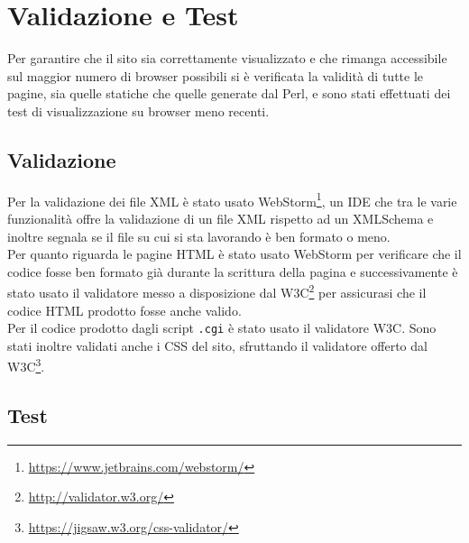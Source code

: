 \section{Validazione e Test}

Per garantire che il sito sia correttamente visualizzato e che rimanga accessibile sul maggior numero di browser possibili si è verificata la validità di tutte le pagine, sia quelle statiche che quelle generate dal Perl, e sono stati effettuati dei test di visualizzazione su browser meno recenti.

\subsection{Validazione}\label{valid}

Per la validazione dei file XML è stato usato WebStorm\footnote{\url{https://www.jetbrains.com/webstorm/}}, un IDE che tra le varie funzionalità offre la validazione di un file XML rispetto ad un XMLSchema e inoltre segnala se il file su cui si sta lavorando è ben formato o meno.\\
Per quanto riguarda le pagine HTML è stato usato WebStorm per verificare che il codice fosse ben formato già durante la scrittura della pagina e successivamente è stato usato il validatore messo a disposizione dal W3C\footnote{\url{http://validator.w3.org/}} per assicurasi che il codice HTML prodotto fosse anche valido.\\
Per il codice prodotto dagli script \texttt{.cgi} è stato usato il validatore W3C.
Sono stati inoltre validati anche i CSS del sito, sfruttando il validatore offerto dal W3C\footnote{\url{https://jigsaw.w3.org/css-validator/}}.
\subsection{Test}

